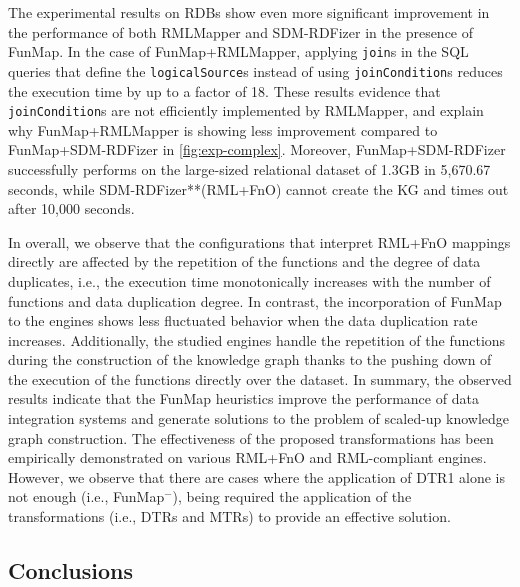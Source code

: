 The experimental results on RDBs show even more significant improvement in the performance of both RMLMapper and SDM-RDFizer in the presence of FunMap. In the case of FunMap+RMLMapper, applying \verb|join|s in the SQL queries that define the \verb|logicalSource|s instead of using \verb|joinCondition|s reduces the execution time by up to a factor of 18. These results evidence that \verb|joinCondition|s are not efficiently implemented by RMLMapper, and explain why FunMap+RMLMapper is showing less improvement compared to FunMap+SDM-RDFizer in \autoref{fig:exp-complex}. Moreover, FunMap+SDM-RDFizer successfully performs on the large-sized relational dataset of 1.3GB in 5,670.67 seconds, while SDM-RDFizer**(RML+FnO) cannot create the KG and times out after 10,000 seconds.

In overall, we observe that the configurations that interpret RML+FnO mappings directly are affected by the repetition of the functions and the degree of data duplicates, i.e., the execution time monotonically increases with the number of functions and data duplication degree. In contrast, the incorporation of FunMap to the engines shows less fluctuated behavior when the data duplication rate increases. Additionally, the studied engines handle the repetition of the functions during the construction of the knowledge graph thanks to the pushing down of the execution of the functions directly over the dataset.
In summary, the observed results indicate that the FunMap heuristics improve the performance of data integration systems and generate solutions to the problem of scaled-up knowledge graph construction. The effectiveness of the proposed transformations has been empirically demonstrated on various RML+FnO and RML-compliant engines. However, we observe that there are cases where the application of DTR1 alone is not enough (i.e., FunMap$^-$), being required the application of the transformations (i.e., DTRs and MTRs) to provide an effective solution. 


\subsection{Conclusions}

